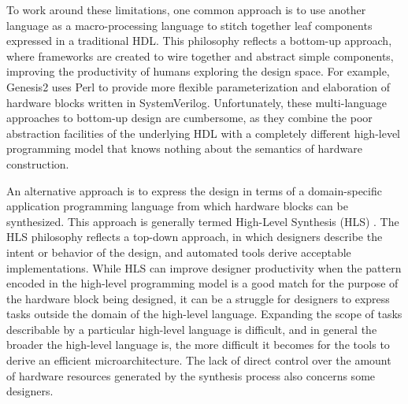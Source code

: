 To work around these limitations, one common approach is to use another language as a macro-processing language to stitch together leaf components expressed in a traditional HDL. 
This philosophy reflects a bottom-up approach, where frameworks are created to wire together and abstract simple components, improving the productivity of humans exploring the design space.
For example, Genesis2 \cite{genesis2} uses Perl to provide more flexible parameterization and elaboration of hardware blocks written in SystemVerilog.
Unfortunately, these multi-language approaches to bottom-up design are cumbersome, as they combine the poor abstraction facilities of the underlying HDL with a completely different high-level programming model that knows nothing about the semantics of hardware construction.

An alternative approach is to express the design in terms of a domain-specific application programming language from which hardware blocks can be synthesized.
This approach is generally termed High-Level Synthesis (HLS) \cite{gajski2012hls}.
The HLS philosophy reflects a top-down approach, in which designers describe the intent or behavior of the design, and automated tools derive acceptable implementations.
While HLS can improve designer productivity when the pattern encoded in the high-level programming model is a good match for the purpose of the hardware block being designed, it can be a struggle for designers to express tasks outside the domain of the high-level language.
Expanding the scope of tasks describable by a particular high-level language is difficult, and
in general the broader the high-level language is, the more difficult it becomes for the tools to derive an efficient microarchitecture.
The lack of direct control over the amount of hardware resources generated by the synthesis process also concerns some designers.

